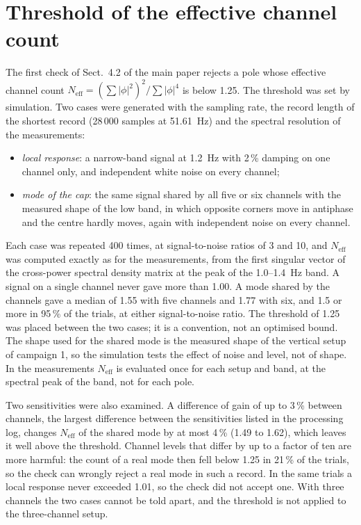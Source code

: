 \documentclass[11pt]{article}
\begin{document}
\section{Threshold of the effective channel count}
\label{sec:s-neff}

The first check of Sect.~4.2 of the main paper rejects a pole whose effective channel count
$N_{\mathrm{eff}} = (\sum|\phi|^2)^2 / \sum|\phi|^4$ is below 1.25. The
threshold was set by simulation. Two cases were generated with the sampling
rate, the record length of the shortest record (28\,000 samples at 51.61~Hz)
and the spectral resolution of the measurements:

\begin{itemize}
\item \emph{local response}: a narrow-band signal at 1.2~Hz with 2\,\% damping
on one channel only, and independent white noise on every channel;
\item \emph{mode of the cap}: the same signal shared by all five or six
channels with the measured shape of the low band, in which opposite corners
move in antiphase and the centre hardly moves, again with independent noise
on every channel.
\end{itemize}

Each case was repeated 400 times, at signal-to-noise ratios of 3 and 10, and
$N_{\mathrm{eff}}$ was computed exactly as for the measurements, from the first
singular vector of the cross-power spectral density matrix at the peak of the
1.0--1.4~Hz band. A signal on a single channel never gave more than 1.00. A
mode shared by the channels gave a median of 1.55 with five channels and 1.77
with six, and 1.5 or more in 95\,\% of the trials, at either signal-to-noise
ratio. The threshold of 1.25 was placed between the two cases; it is a convention, not an optimised bound. The shape used for the shared mode is the measured shape of the vertical setup of campaign 1, so the simulation tests the effect of noise and level, not of shape. In the measurements $N_{\mathrm{eff}}$ is evaluated once for each setup and band, at the spectral peak of the band, not for each pole.

Two sensitivities were also examined. A difference of gain of up to 3\,\%
between channels, the largest difference between the sensitivities listed in
the processing log, changes $N_{\mathrm{eff}}$ of the shared mode by at most
4\,\% (1.49 to 1.62), which leaves it well above the threshold. Channel levels
that differ by up to a factor of ten are more harmful: the
count of a real mode then fell below 1.25 in 21\,\% of the trials, so the
check can wrongly reject a real mode in such a record. In the same trials a
local response never exceeded 1.01, so the check did not accept one. With three
channels the two cases cannot be told apart, and the threshold is not applied
to the three-channel setup.
\end{document}
